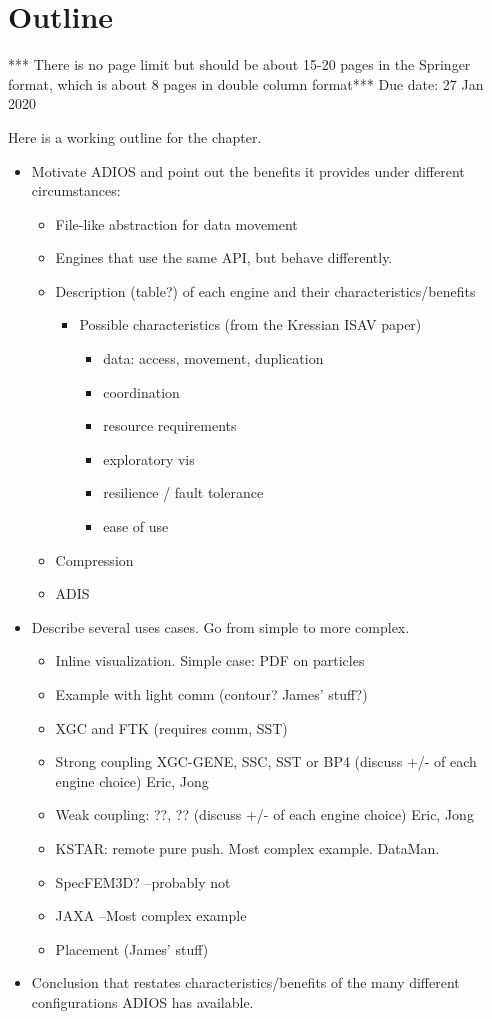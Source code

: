 \newpage
\section{Outline}
*** There is no page limit but should be about 15-20 pages in the Springer format, which is about 8 pages in double column format***
Due date: 27 Jan 2020

Here is a working outline for the chapter.


\begin{itemize}
\item Motivate ADIOS and point out the benefits it provides under different circumstances:
\begin{itemize}
\item File-like abstraction for data movement
\item Engines that use the same API, but behave differently.
\item Description (table?) of each engine and their characteristics/benefits
\begin{itemize}
\item Possible characteristics (from the Kressian ISAV paper)
\begin{itemize}
\item data: access, movement, duplication
\item coordination
\item resource requirements
\item exploratory vis
\item resilience / fault tolerance
\item ease of use
\end{itemize}
\end{itemize}
\item Compression
\item ADIS
\end{itemize}
\item Describe several uses cases. Go from simple to more complex.
\begin{itemize}
\item Inline visualization. Simple case: PDF on particles
\item Example with light comm (contour? James' stuff?)
\item XGC and FTK (requires comm, SST)
\item Strong coupling XGC-GENE, SSC, SST or BP4 (discuss +/- of each engine choice) Eric, Jong
\item Weak coupling: ??, ?? (discuss +/- of each engine choice) Eric, Jong
\item KSTAR: remote pure push. Most complex example. DataMan.
\item SpecFEM3D? --probably not
\item JAXA --Most complex example
\item Placement (James' stuff)
\end{itemize}
\item Conclusion that restates characteristics/benefits of the many different configurations ADIOS has available. 
\end{itemize}

